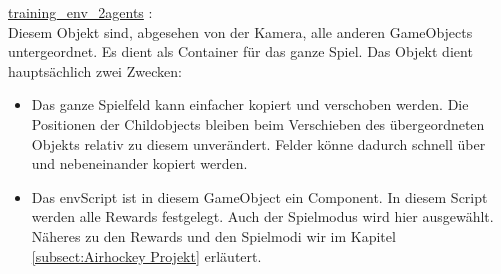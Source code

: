 \underline{training\_env\_2agents} :\\
Diesem Objekt sind, abgesehen von der Kamera, alle anderen GameObjects untergeordnet. Es dient als Container für das ganze Spiel. Das Objekt dient hauptsächlich zwei Zwecken:
\begin{itemize}
\item Das ganze Spielfeld kann einfacher kopiert und verschoben werden. Die Positionen der Childobjects bleiben beim Verschieben des übergeordneten Objekts relativ zu diesem unverändert. Felder könne dadurch schnell über und nebeneinander kopiert werden.
\item Das envScript ist in diesem GameObject ein Component. In diesem Script werden alle Rewards festgelegt. Auch der Spielmodus wird hier ausgewählt. Näheres zu den Rewards und den Spielmodi wir im Kapitel \ref{subsect:Airhockey Projekt} erläutert.
\end{itemize}